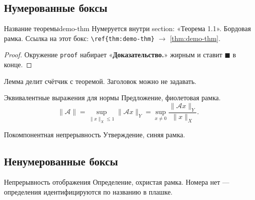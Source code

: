 %

\subsection{Нумерованные боксы}

\begin{Theorem}{Название теоремы}{demo-thm}
	Нумеруется внутри section: «Теорема 1.1». Бордовая рамка.
	Ссылка на этот бокс: \verb|\ref{thm:demo-thm}| $\to$ \ref{thm:demo-thm}.
\end{Theorem}

\begin{proof}
	Окружение \verb|proof| набирает «\textbf{Доказательство.}» жирным
	и ставит $\blacksquare$ в конце.
\end{proof}

\begin{Lemma}{}{}
	Лемма делит счётчик с теоремой. Заголовок можно не задавать.
\end{Lemma}

\begin{Proposition}{Эквивалентные выражения для нормы}{}
	Предложение, фиолетовая рамка.
	\[
	\|\mathcal{A}\| = \sup_{\|x\|_X \le 1} \|\mathcal{A}x\|_Y
	= \sup_{x \neq 0} \frac{\|\mathcal{A}x\|_Y}{\|x\|_X}.
	\]
\end{Proposition}

\begin{Statement}{Покомпонентная непрерывность}{}
	Утверждение, синяя рамка.
\end{Statement}

\subsection{Ненумерованные боксы}

\begin{Definition}{Непрерывность отображения}{}
	Определение, охристая рамка. Номера нет — определения
	идентифицируются по названию в плашке.
\end{Definition}

